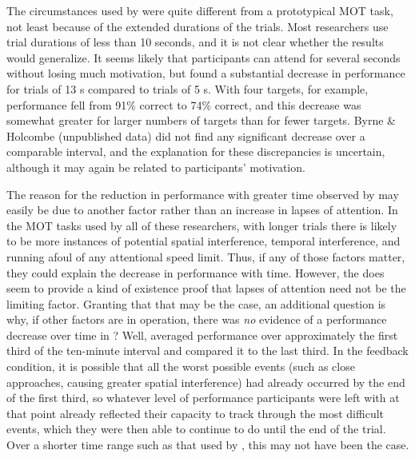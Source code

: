 \documentclass[]{book}
\begin{document}
The circumstances used by \citet{wolfeMultipleObjectJuggling2007} were quite different from a prototypical MOT task, not least because of the extended durations of the trials. Most researchers use trial durations of less than 10 seconds, and it is not clear whether the \citet{wolfeMultipleObjectJuggling2007} results would generalize. It seems likely that participants can attend for several seconds without losing much motivation, but \citet{oksamaMultipleObjectTracking2004} found a substantial decrease in performance for trials of 13 s compared to trials of 5 s. With four targets, for example, performance fell from 91\% correct to 74\% correct, and this decrease was somewhat greater for larger numbers of targets than for fewer targets. Byrne \& Holcombe (unpublished data) did not find any significant decrease over a comparable interval, and the explanation for these discrepancies is uncertain, although it may again be related to participants' motivation.

The reason for the reduction in performance with greater time observed by \citet{oksamaMultipleObjectTracking2004} may easily be due to another factor rather than an increase in lapses of attention. In the MOT tasks used by all of these researchers, with longer trials there is likely to be more instances of potential spatial interference, temporal interference, and running afoul of any attentional speed limit. Thus, if any of those factors matter, they could explain the decrease in performance with time. However, the \citet{wolfeMultipleObjectJuggling2007} does seem to provide a kind of existence proof that lapses of attention need not be the limiting factor. Granting that that may be the case, an additional question is why, if other factors are in operation, there was \emph{no} evidence of a performance decrease over time in \citet{wolfeMultipleObjectJuggling2007}? Well, \citet{wolfeMultipleObjectJuggling2007} averaged performance over approximately the first third of the ten-minute interval and compared it to the last third. In the feedback condition, it is possible that all the worst possible events (such as close approaches, causing greater spatial interference) had already occurred by the end of the first third, so whatever level of performance participants were left with at that point already reflected their capacity to track through the most difficult events, which they were then able to continue to do until the end of the trial. Over a shorter time range such as that used by \citet{oksamaMultipleObjectTracking2004}, this may not have been the case.
\end{document}
